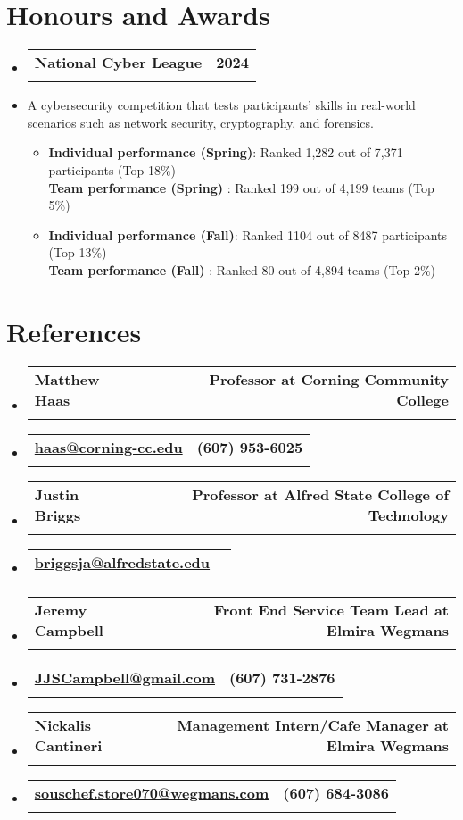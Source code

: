 \documentclass[letterpaper,11pt]{article}
\makeatletter
\newcommand{\resumeItem}[1]{
  \item\small{
    {#1 \vspace{-2pt}}
  }
}
\newcommand{\resumeSubheading}[4]{
  \vspace{-2pt}\item
    \begin{tabular*}{1.0\textwidth}[t]{l@{\extracolsep{\fill}}r}
      \textbf{#1} & \textbf{\small #2} \\
      \textit{\small#3} & \textit{\small #4} \\
    \end{tabular*}\vspace{-7pt}
}
\newcommand{\resumeSubHeadingListStart}{\begin{itemize}[leftmargin=0.0in, label={}]}
\newcommand{\resumeSubHeadingListEnd}{\end{itemize}}
\makeatother
\begin{document}
\section{Honours and Awards}

\resumeSubHeadingListStart
\resumeSubheading{National Cyber League}{2024}{}{}
\vspace{-15pt}
\resumeItem{
    A cybersecurity competition that tests participants' skills in real-world scenarios such as network security, cryptography, and forensics.
}
\begin{itemize}[leftmargin=0.15in, label={}]
  \item{
        \textbf{Individual performance (Spring)}{: Ranked 1,282 out of 7,371 participants (Top 18\%)} \\
        \textbf{Team performance (Spring)} {: Ranked 199 out of 4,199 teams (Top 5\%)} \\
        }  \item{
        \textbf{Individual performance (Fall)}{: Ranked 1104 out of 8487 participants (Top 13\%)} \\
        \textbf{Team performance (Fall)} {: Ranked 80 out of 4,894 teams (Top 2\%)} \\
        }
\end{itemize}
\vspace{-10pt}

\resumeSubHeadingListEnd

\section{References}

\resumeSubHeadingListStart
\resumeSubheading{Matthew Haas}{Professor at Corning Community College}{}{}
\vspace{-20pt}
\resumeSubheading{\href{mailto:haas@corning-cc.edu}{haas@corning-cc.edu}}{(607) 953-6025}{}{}
\vspace{-10pt}

\resumeSubheading{Justin Briggs}{Professor at Alfred State College of Technology}{}{}
\vspace{-20pt}
\resumeSubheading{\href{mailto:briggsja@alfredstate.edu}{briggsja@alfredstate.edu}}{}{}{}
\vspace{-10pt}

\resumeSubheading{Jeremy Campbell}{Front End Service Team Lead at Elmira Wegmans}{}{}
\vspace{-20pt}
\resumeSubheading{\href{mailto:JJSCampbell@gmail.com}{JJSCampbell@gmail.com}}{(607) 731-2876}{}{}
\vspace{-10pt}

\resumeSubheading{Nickalis Cantineri}{Management Intern/Cafe Manager at Elmira Wegmans}{}{}
\vspace{-20pt}
\resumeSubheading{\href{mailto:seafood.store070@wegmans.com}{souschef.store070@wegmans.com}}{(607) 684-3086}{}{}
\vspace{-10pt}

\resumeSubHeadingListEnd
\end{document}

